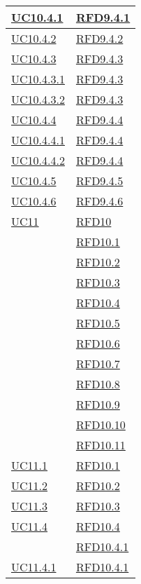 \begin{longtable}{|>{\centering}m{5cm}|m{5cm}<{\centering}|}
\hyperref[UC10.4.1]{UC10.4.1} & \hyperlink{RFD9.4.1}{RFD9.4.1}\\ \hline
\hyperref[UC10.4.2]{UC10.4.2} & \hyperlink{RFD9.4.2}{RFD9.4.2}\\ \hline
\hyperref[UC10.4.3]{UC10.4.3} & \hyperlink{RFD9.4.3}{RFD9.4.3}\\ \hline
\hyperref[UC10.4.3.1]{UC10.4.3.1} & \hyperlink{RFD9.4.3}{RFD9.4.3}\\ \hline
\hyperref[UC10.4.3.2]{UC10.4.3.2} & \hyperlink{RFD9.4.3}{RFD9.4.3}\\ \hline
\hyperref[UC10.4.4]{UC10.4.4} & \hyperlink{RFD9.4.4}{RFD9.4.4}\\ \hline
\hyperref[UC10.4.4.1]{UC10.4.4.1} & \hyperlink{RFD9.4.4}{RFD9.4.4}\\ \hline
\hyperref[UC10.4.4.2]{UC10.4.4.2} & \hyperlink{RFD9.4.4}{RFD9.4.4}\\ \hline
\hyperref[UC10.4.5]{UC10.4.5} & \hyperlink{RFD9.4.5}{RFD9.4.5}\\ \hline
\hyperref[UC10.4.6]{UC10.4.6} & \hyperlink{RFD9.4.6}{RFD9.4.6}\\ \hline
\hyperref[UC11]{UC11} & \hyperlink{RFD10}{RFD10}\\
& \hyperlink{RFD10.1}{RFD10.1}\\
& \hyperlink{RFD10.2}{RFD10.2}\\
& \hyperlink{RFD10.3}{RFD10.3}\\
& \hyperlink{RFD10.4}{RFD10.4}\\
& \hyperlink{RFD10.5}{RFD10.5}\\
& \hyperlink{RFD10.6}{RFD10.6}\\
& \hyperlink{RFD10.7}{RFD10.7}\\
& \hyperlink{RFD10.8}{RFD10.8}\\
& \hyperlink{RFD10.9}{RFD10.9}\\
& \hyperlink{RFD10.10}{RFD10.10}\\
& \hyperlink{RFD10.11}{RFD10.11}\\ \hline
\hyperref[UC11.1]{UC11.1} & \hyperlink{RFD10.1}{RFD10.1}\\ \hline
\hyperref[UC11.2]{UC11.2} & \hyperlink{RFD10.2}{RFD10.2}\\ \hline
\hyperref[UC11.3]{UC11.3} & \hyperlink{RFD10.3}{RFD10.3}\\ \hline
\hyperref[UC11.4]{UC11.4} & \hyperlink{RFD10.4}{RFD10.4}\\
& \hyperlink{RFD10.4.1}{RFD10.4.1}\\ \hline
\hyperref[UC11.4.1]{UC11.4.1} & \hyperlink{RFD10.4.1}{RFD10.4.1}\\ \hline

\end{longtable}
